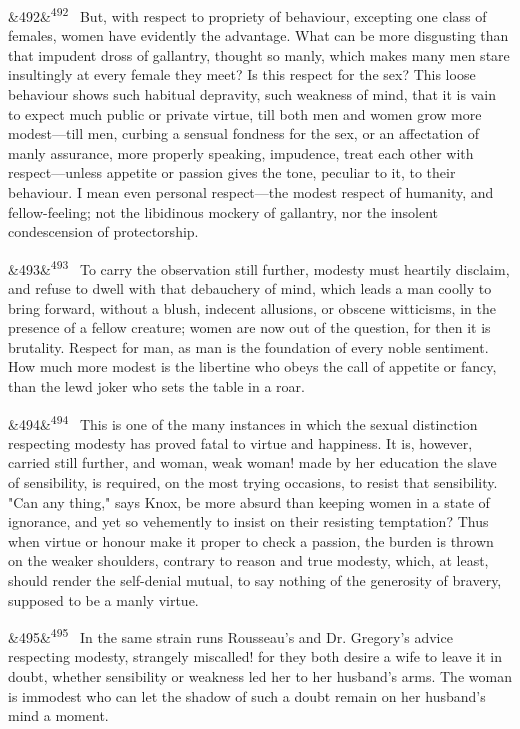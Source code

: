 \documentclass[12pt]{article}
\newcommand{\para}[1][]{\par\noindent\ifx&#1&\else\textsuperscript{\footnotesize #1}~\fi}
\begin{document}
\para[492] But, with respect to propriety of behaviour, excepting one class of females, women have evidently the advantage. What can be more disgusting than that impudent dross of gallantry, thought so manly, which makes many men stare insultingly at every female they meet? Is this respect for the sex? This loose behaviour shows such habitual depravity, such weakness of mind, that it is vain to expect much public or private virtue, till both men and women grow more modest---till men, curbing a sensual fondness for the sex, or an affectation of manly assurance, more properly speaking, impudence, treat each other with respect---unless appetite or passion gives the tone, peculiar to it, to their behaviour. I mean even personal respect---the modest respect of humanity, and fellow-feeling; not the libidinous mockery of gallantry, nor the insolent condescension of protectorship.

\para[493] To carry the observation still further, modesty must heartily disclaim, and refuse to dwell with that debauchery of mind, which leads a man coolly to bring forward, without a blush, indecent allusions, or obscene witticisms, in the presence of a fellow creature; women are now out of the question, for then it is brutality. Respect for man, as man is the foundation of every noble sentiment. How much more modest is the libertine who obeys the call of appetite or fancy, than the lewd joker who sets the table in a roar.

\para[494] This is one of the many instances in which the sexual distinction respecting modesty has proved fatal to virtue and happiness. It is, however, carried still further, and woman, weak woman! made by her education the slave of sensibility, is required, on the most trying occasions, to resist that sensibility. "Can any thing," says Knox, be more absurd than keeping women in a state of ignorance, and yet so vehemently to insist on their resisting temptation? Thus when virtue or honour make it proper to check a passion, the burden is thrown on the weaker shoulders, contrary to reason and true modesty, which, at least, should render the self-denial mutual, to say nothing of the generosity of bravery, supposed to be a manly virtue.

\para[495] In the same strain runs Rousseau's and Dr. Gregory's advice respecting modesty, strangely miscalled! for they both desire a wife to leave it in doubt, whether sensibility or weakness led her to her husband's arms. The woman is immodest who can let the shadow of such a doubt remain on her husband's mind a moment.
\end{document}
